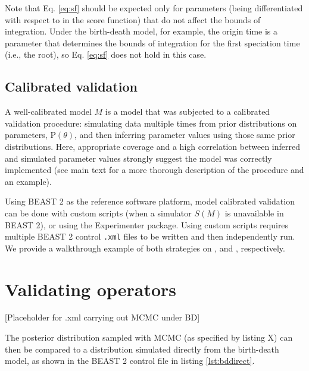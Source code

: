 \documentclass[oneside]{article}
\begin{document}
Note that Eq. \ref{eq:sf} should be expected only for parameters
(being differentiated with respect to in the score function) that
do not affect the bounds of integration.
Under the birth-death model, for example, the origin time is a parameter
that determines the bounds of integration for the first speciation
time (i.e., the root), so Eq. \ref{eq:sf} does not hold in this case.

\subsection*{Calibrated validation}

A well-calibrated model $M$ is a model that was subjected to a calibrated
validation procedure: simulating data multiple times from prior
distributions on parameters, $\text{P}(\theta)$, and then
inferring parameter values using those same prior distributions.
Here, appropriate coverage and a high correlation between inferred and
simulated parameter values strongly suggest the model was correctly
implemented (see main text for a more thorough description of the
procedure and an example).

Using BEAST 2 as the reference software platform, model calibrated
validation can be done with custom scripts (when a simulator $S(M)$ is
unavailable in BEAST 2), or using the Experimenter
package.
Using custom scripts requires multiple BEAST 2 control \texttt{.xml}
files to be written and then independently run.
We provide a walkthrough example of both strategies on
{\color{red}{PUT LINK HERE}}, and {\color{red}{PUT LINK HERE}},
respectively.

\section*{Validating operators}

[Placeholder for .xml carrying out MCMC under BD]

The posterior distribution sampled with MCMC (as specified by listing X)
can then be compared to a distribution simulated directly from the
birth-death model, as shown in the BEAST 2 control file in listing \ref{lst:bddirect}.
\end{document}
